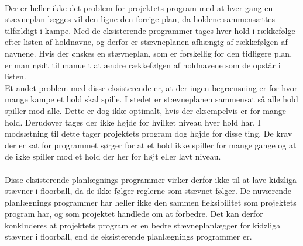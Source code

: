 \\
Der er heller ikke det problem for projektets program med at hver gang en stævneplan lægges vil den ligne den forrige plan, da holdene sammensættes tilfældigt i kampe. Med de eksisterende programmer tages hver hold i rækkefølge efter listen af holdnavne, og derfor er stævneplanen afhængig af rækkefølgen af navnene. Hvis der ønskes en stævneplan, som er forskellig for den tidligere plan, er man nødt til manuelt at ændre rækkefølgen af holdnavene som de opstår i listen.
\\
Et andet problem med disse eksisterende er, at der ingen begrænsning er for hvor mange kampe et hold skal spille. I stedet er stævneplanen sammensat så alle hold spiller mod alle. Dette er dog ikke optimalt, hvis der eksempelvis er for mange hold. Derudover tages der ikke højde for hvilket niveau hver hold har. I modsætning til dette tager projektets program dog højde for disse ting. De krav der er sat for programmet sørger for at et hold ikke spiller for mange gange og at de ikke spiller mod et hold der her for højt eller lavt niveau.
\\\\
Disse eksisterende planlægnings programmer virker derfor ikke til at lave kidzliga stævner i floorball, da de ikke følger reglerne som stævnet følger. De nuværende planlægnings programmer har heller ikke den sammen fleksibilitet som projektets program har, og som projektet handlede om at forbedre. Det kan derfor konkluderes at projektets program er en bedre stævneplanlægger for kidzliga stævner i floorball, end de eksisterende planlægnings programmer er.  

